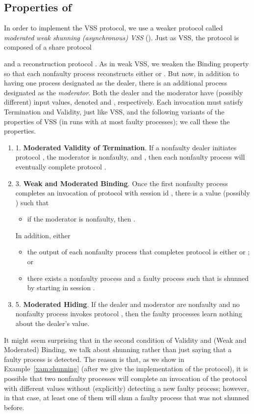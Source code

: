 \documentclass{sig-alternate}
\def\beginsmall#1{\vspace{-\parskip}\begin{#1}\itemsep-\parskip}
\def\endsmall#1{\end{#1}\vspace{-\parskip}}
\newcommand{\mwdavss}{\text{MW-SVSS}\xspace}
\begin{document}
\subsection{Properties of \mwdavss}
In order to implement the VSS protocol, we use a weaker protocol called
\emph{moderated weak shunning (asynchronous) VSS} (\mwdavss).
Just as VSS, the \mwdavss protocol is composed of a share protocol

and a reconstruction protocol .
As in weak VSS, we weaken the Binding property so that each
nonfaulty process reconstructs either  or .
But now, in addition to
having one process  designated as the dealer,
there is
an additional
process designated as the
\emph{moderator}.
Both the dealer and the moderator have (possibly different) input
values, denoted  and ,
respectively.
Each \mwdavss invocation must satisfy Termination and Validity,
just like VSS, and the following variants of the properties of VSS
(in runs with at most  faulty processes); we call these the
\emph{\mwdavss} properties.
\beginsmall{enumerate}
\item [1.] \textbf{Moderated Validity of Termination}. If a nonfaulty
    dealer initiates protocol , the moderator is nonfaulty, and ,
    then each nonfaulty process will eventually complete protocol .

\item [3.] \textbf{Weak and Moderated Binding}.
Once the first nonfaulty process completes
an invocation of protocol  with session id ,
there is a value  (possibly ) such that
\beginsmall{itemize}
 \item if the moderator is nonfaulty, then .
 \endsmall{itemize}
In addition, either
 \beginsmall{itemize}
 \item the output of each nonfaulty process that completes protocol
     is either  or ; or
 \item  there exists a nonfaulty process  and a faulty process 
    such that  is shunned by  starting in session .
 \endsmall{itemize}


\item [5.] \textbf{Moderated Hiding}.  If the dealer and moderator
are nonfaulty and no nonfaulty process invokes protocol
, then the faulty processes learn nothing about
the dealer's value.
\endsmall{enumerate}


It might seem surprising that in the second condition of Validity and
(Weak and Moderated) Binding, we talk about shunning rather than just
saying that a faulty process is detected.  The reason is that, as we
show in Example~\ref{xam:shunning} (after we give the implementation of
the \mwdavss protocol), it is possible that two nonfaulty processes
will complete an invocation of the \mwdavss protocol
with different values
without
(explicitly)
detecting
a new faulty process; however, in that case, at least one of them will
shun a faulty process that was not shunned before.
\end{document}
